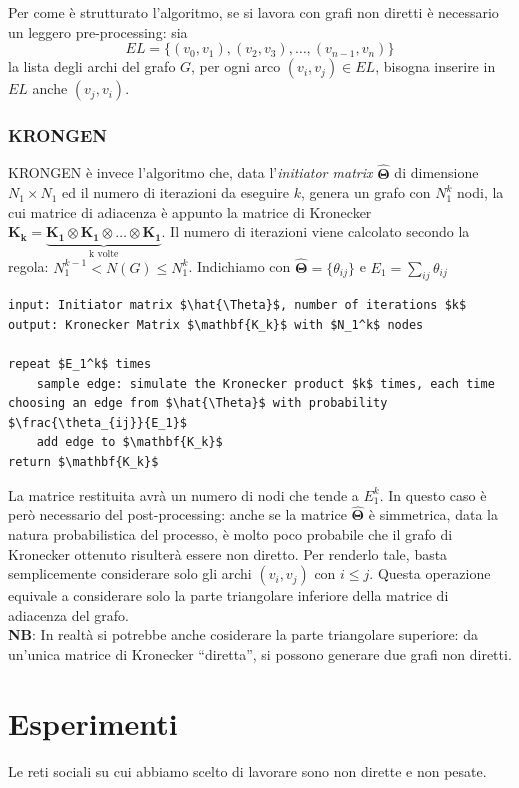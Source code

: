 \documentclass[12pt]{scrartcl}
\begin{document}
Per come è strutturato l'algoritmo, se si lavora con grafi non diretti è necessario un leggero pre-processing: sia
\[EL = \{(v_0, v_1), (v_2, v_3), \ldots, (v_{n-1}, v_{n})\}\]
la lista degli archi del grafo $G$, per ogni arco $(v_i, v_j)\in EL$, bisogna inserire in $EL$ anche $(v_j, v_i)$.

\subsubsection{KRONGEN}
\textsf{KRONGEN} è invece l'algoritmo che, data l'\textit{initiator matrix} $\mathbf{\hat{\Theta}}$ di dimensione $N_1\times N_1$ ed il numero di iterazioni da eseguire $k$, genera un grafo con $N_1^k$ nodi, la cui matrice di adiacenza è appunto la matrice di Kronecker $\mathbf{K_k} =\underbrace{\mathbf{K_1}\otimes \mathbf{K_1}\otimes \ldots \otimes \mathbf{K_1}}_\text{k volte}$. Il numero di iterazioni viene calcolato secondo la regola: $N_1^{k-1}<N(G)\leq N^k_1$. Indichiamo con $\mathbf{\hat{\Theta}} = \{\theta_{ij}\}$ e $E_1 = \sum_{ij}\theta_{ij}$

\begin{lstlisting}[mathescape=true, style=mystyle]
input: Initiator matrix $\hat{\Theta}$, number of iterations $k$
output: Kronecker Matrix $\mathbf{K_k}$ with $N_1^k$ nodes

repeat $E_1^k$ times
	sample edge: simulate the Kronecker product $k$ times, each time choosing an edge from $\hat{\Theta}$ with probability $\frac{\theta_{ij}}{E_1}$
	add edge to $\mathbf{K_k}$
return $\mathbf{K_k}$
\end{lstlisting}

La matrice restituita avrà un numero di nodi che tende a $E_1^k$. In questo caso è però necessario del post-processing: anche se la matrice $\mathbf{\hat{\Theta}}$ è simmetrica, data la natura probabilistica del processo, è molto poco probabile che il grafo di Kronecker ottenuto risulterà essere non diretto. Per renderlo tale, basta semplicemente considerare solo gli archi $(v_i, v_j)$ con $i\leq j$. Questa operazione equivale a considerare solo la parte triangolare inferiore della matrice di adiacenza del grafo.\\
\textbf{NB}: In realtà si potrebbe anche cosiderare la parte triangolare superiore: da un'unica matrice di Kronecker ``diretta'', si possono generare due grafi non diretti.

\section{Esperimenti}
Le reti sociali su cui abbiamo scelto di lavorare sono non dirette e non pesate.
\end{document}
